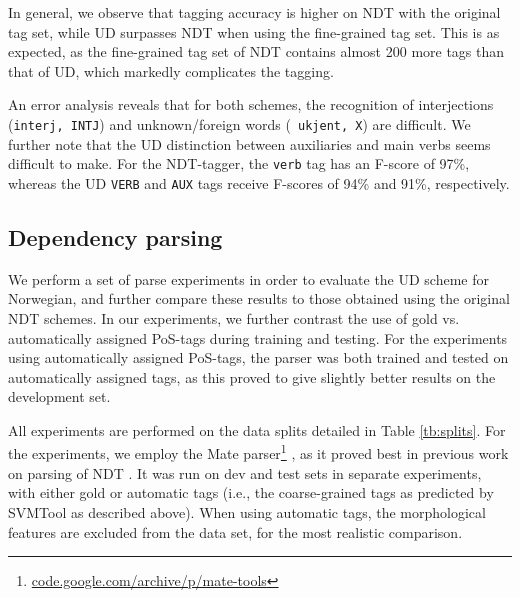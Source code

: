 \documentclass[10pt, a4paper]{article}
\begin{document}
In general, we observe that tagging accuracy is higher on NDT with the
original tag set, while UD surpasses NDT when using the fine-grained
tag set. This is as expected, as the fine-grained tag set of NDT
contains almost 200 more tags than that of UD, which markedly
complicates the tagging.

An error analysis reveals that for both schemes, the recognition of
interjections ({\tt interj, INTJ}) and unknown/foreign words ({\tt
  ukjent, X}) are difficult. We further note that the UD distinction
between auxiliaries and main verbs seems difficult to make. For the
NDT-tagger, the {\tt verb} tag has an F-score of 97\%, whereas the UD
{\tt VERB} and {\tt AUX} tags receive F-scores of 94\% and 91\%,
respectively.


\subsection{Dependency parsing}
We perform a set of parse experiments in order to evaluate the UD
scheme for Norwegian, and further compare these results to those
obtained using the original NDT schemes. In our experiments, we
further contrast the use of gold vs. automatically assigned PoS-tags
during training and testing. For the experiments using automatically
assigned PoS-tags, the parser was both trained and tested on
automatically assigned tags, as this proved to give slightly better
results on the development set.

All experiments are performed on the data splits detailed in Table
\ref{tb:splits}. For the experiments, we employ the Mate
parser\footnote{\url{code.google.com/archive/p/mate-tools}}
\cite{Boh:10}, as it proved best in previous work on parsing of NDT
\cite{Sol:Skj:Ovr:14}. It was run on dev and test sets in separate
experiments, with either gold or automatic tags (i.e., the
coarse-grained tags as predicted by SVMTool as described above).  When
using automatic tags, the morphological features are excluded from the
data set, for the most realistic comparison.
\end{document}
